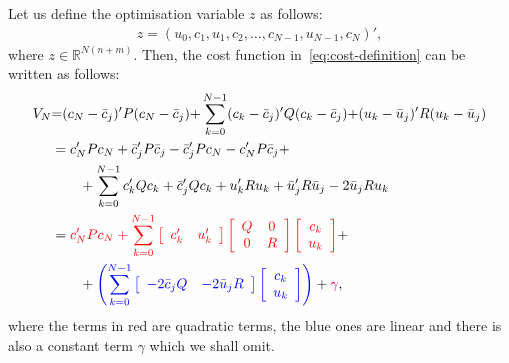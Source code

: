 \documentclass[12pt]{scrartcl}
\renewcommand{\Re}{\mathbb{R}}
\newcommand{\bcj}{\bar{c}_j}
\newcommand{\buj}{\bar{u}_j}
\begin{document}
Let us define the optimisation variable $z$ as follows:
\begin{align}
z=\left( u_0, c_1, u_1, c_2, \ldots, c_{N-1}, u_{N-1}, c_{N}\right)',
\end{align}
where $z\in\Re^{N(n+m)}$. Then, the cost function in~\eqref{eq:cost-definition}
can be written as follows:
\begin{align*}
V_N &{=} (c_N-\bcj)'P(c_N-\bcj) {+} \sum_{k=0}^{N-1}(c_k-\bcj)'Q(c_k-\bcj){+} 
		(u_k-\buj)'R(u_k-\buj)\\
		&= c_N' P c_N + \bcj' P \bcj - \bcj' P c_N - c_N' P \bcj +\\
		  &\qquad + \sum_{k=0}^{N-1} c_k' Q c_k + \bcj' Q c_k + u_k' R u_k + \buj' R \buj - 2\buj R u_k\\
		&=\textcolor{red}{c_N' P c_N + \sum_{k=0}^{N-1} \left[ \begin{array}{cc}c_k' & u_k'\end{array}\right]
\left[ \begin{array}{cc}
Q & 0\\0 & R
\end{array}\right]
\left[ \begin{array}{c}
c_k\\
u_k
\end{array}\right]}+\\
&\qquad+\textcolor{blue}{\left( 
\sum_{k=0}^{N-1}\left[ \begin{array}{cc}
-2\bcj Q & -2\buj R
\end{array}\right]\left[ 
\begin{array}{c}
c_k\\u_k
\end{array}\right]
\right)}+\textcolor{magenta}{\gamma},
\end{align*}
where the terms in red are quadratic terms, the blue ones are linear and
there is also a constant term $\gamma$ which we shall omit.
\end{document}

